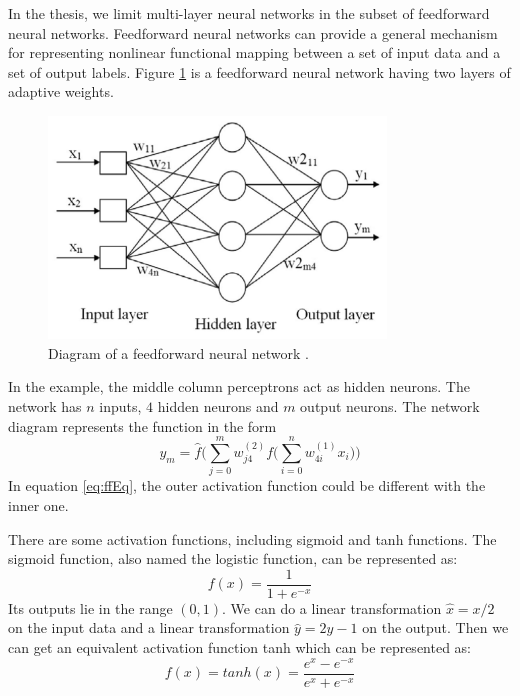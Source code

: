In the thesis, we limit multi-layer neural networks in the subset of feedforward neural networks. Feedforward neural networks can provide a general mechanism for representing nonlinear functional mapping between a set of input data and a set of output labels. Figure \ref{fig:ffnet} is a feedforward neural network having two layers of adaptive weights.

\begin{figure}[!htb]
\centering
\includegraphics[width=0.8\textwidth]{Figure2-2.png}
\caption{\label{fig:ffnet}Diagram of a feedforward neural network \citep{zainal2013oil}.}
\end{figure}

In the example, the middle column perceptrons act as hidden neurons. The network has $n$ inputs, $4$ hidden neurons and $m$ output neurons. The network diagram represents the function in the form
\begin{equation}\label{eq:ffEq}
y_{m} = \hat{f}\Big(\sum_{j=0}^{m}w_{j4}^{(2)}f\big(\sum_{i=0}^{n}w_{4i}^{(1)}x_{i}\big)\Big)
\end{equation}
In equation \ref{eq:ffEq}, the outer activation function could be different with the inner one.

There are some activation functions, including sigmoid and tanh functions. The sigmoid function, also named the logistic function, can be represented as: 
\begin{equation}\label{eq:sigmoid}
f(x) = \frac{1}{1+e^{-x}}
\end{equation}
Its outputs lie in the range $(0,1)$. We can do a linear transformation $\hat{x}=x/2$ on the input data and a linear transformation $\hat{y}=2y-1$ on the output. Then we can get an equivalent activation function tanh which can be represented as:
\begin{equation}\label{eq:tanh}
f(x) = tanh(x) = \frac{e^{x}-e^{-x}}{e^{x}+e^{-x}}
\end{equation}

